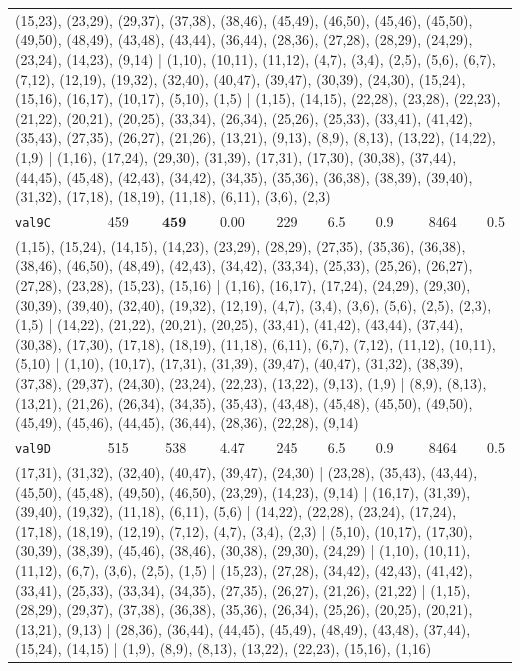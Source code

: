 \begin{longtable}{lrrrrrrrr}
\multicolumn{9}{p{0.96\linewidth}}{\tiny\raggedright\arraybackslash (15,23), (23,29), (29,37), (37,38), (38,46), (45,49), (46,50), (45,46), (45,50), (49,50), (48,49), (43,48), (43,44), (36,44), (28,36), (27,28), (28,29), (24,29), (23,24), (14,23), (9,14) | (1,10), (10,11), (11,12), (4,7), (3,4), (2,5), (5,6), (6,7), (7,12), (12,19), (19,32), (32,40), (40,47), (39,47), (30,39), (24,30), (15,24), (15,16), (16,17), (10,17), (5,10), (1,5) | (1,15), (14,15), (22,28), (23,28), (22,23), (21,22), (20,21), (20,25), (33,34), (26,34), (25,26), (25,33), (33,41), (41,42), (35,43), (27,35), (26,27), (21,26), (13,21), (9,13), (8,9), (8,13), (13,22), (14,22), (1,9) | (1,16), (17,24), (29,30), (31,39), (17,31), (17,30), (30,38), (37,44), (44,45), (45,48), (42,43), (34,42), (34,35), (35,36), (36,38), (38,39), (39,40), (31,32), (17,18), (18,19), (11,18), (6,11), (3,6), (2,3)} \\[2pt]
\texttt{val9C} & 459 & $\mathbf{459}$ & 0.00 & 229 & 6.5 & 0.9 & 8464 & 0.5 \\
\multicolumn{9}{p{0.96\linewidth}}{\tiny\raggedright\arraybackslash (1,15), (15,24), (14,15), (14,23), (23,29), (28,29), (27,35), (35,36), (36,38), (38,46), (46,50), (48,49), (42,43), (34,42), (33,34), (25,33), (25,26), (26,27), (27,28), (23,28), (15,23), (15,16) | (1,16), (16,17), (17,24), (24,29), (29,30), (30,39), (39,40), (32,40), (19,32), (12,19), (4,7), (3,4), (3,6), (5,6), (2,5), (2,3), (1,5) | (14,22), (21,22), (20,21), (20,25), (33,41), (41,42), (43,44), (37,44), (30,38), (17,30), (17,18), (18,19), (11,18), (6,11), (6,7), (7,12), (11,12), (10,11), (5,10) | (1,10), (10,17), (17,31), (31,39), (39,47), (40,47), (31,32), (38,39), (37,38), (29,37), (24,30), (23,24), (22,23), (13,22), (9,13), (1,9) | (8,9), (8,13), (13,21), (21,26), (26,34), (34,35), (35,43), (43,48), (45,48), (45,50), (49,50), (45,49), (45,46), (44,45), (36,44), (28,36), (22,28), (9,14)} \\[2pt]
\texttt{val9D} & 515 & 538 & 4.47 & 245 & 6.5 & 0.9 & 8464 & 0.5 \\
\multicolumn{9}{p{0.96\linewidth}}{\tiny\raggedright\arraybackslash (17,31), (31,32), (32,40), (40,47), (39,47), (24,30) | (23,28), (35,43), (43,44), (45,50), (45,48), (49,50), (46,50), (23,29), (14,23), (9,14) | (16,17), (31,39), (39,40), (19,32), (11,18), (6,11), (5,6) | (14,22), (22,28), (23,24), (17,24), (17,18), (18,19), (12,19), (7,12), (4,7), (3,4), (2,3) | (5,10), (10,17), (17,30), (30,39), (38,39), (45,46), (38,46), (30,38), (29,30), (24,29) | (1,10), (10,11), (11,12), (6,7), (3,6), (2,5), (1,5) | (15,23), (27,28), (34,42), (42,43), (41,42), (33,41), (25,33), (33,34), (34,35), (27,35), (26,27), (21,26), (21,22) | (1,15), (28,29), (29,37), (37,38), (36,38), (35,36), (26,34), (25,26), (20,25), (20,21), (13,21), (9,13) | (28,36), (36,44), (44,45), (45,49), (48,49), (43,48), (37,44), (15,24), (14,15) | (1,9), (8,9), (8,13), (13,22), (22,23), (15,16), (1,16)} \\[2pt]

\end{longtable}
